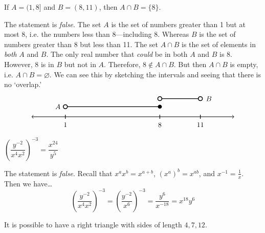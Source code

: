 \documentclass[11pt,letterpaper]{article}
\begin{document}
\thispagestyle{title}

 If $A= (1, 8]$ and $B= (8, 11)$, then $A \cap B= \{ 8 \}$. \pspace

\sol The statement is \textit{false}. The set $A$ is the set of numbers greater than 1 but at most 8, i.e. the numbers less than 8---including 8. Whereas $B$ is the set of numbers greater than 8 but less than 11. The set $A \cap B$ is the set of elements in \textit{both} $A$ and $B$. The only real number that \textit{could} be in both $A$ and $B$ is $8$. However, 8 is in $B$ but not in $A$. Therefore, $8 \notin A \cap B$. But then $A \cap B$ is empty, i.e. $A \cap B= \varnothing$. We can see this by sketching the intervals and seeing that there is no `overlap.' 
	\[
	\begin{tikzpicture}
	\draw[line width=0.03cm,<->] (-5,0) -- (5,0);		%
	
	\draw[line width=0.03cm] (-3.33,-0.1) -- (-3.33,0.1);	%
	\draw[line width=0.03cm] (1.33,-0.1) -- (1.33,0.1); 	%
	\draw[line width=0.03cm] (3.33,-0.1) -- (3.33,0.1);	%
	\draw[line width=0.03cm] (-3.33, 0.5) -- (1.33,0.5);			%
	\draw[fill=white,line width=0.04cm] (-3.33,0.5) circle (0.1);		%
	\draw[draw=none,fill=black] (1.33,0.5) circle (0.1);			%
	\node at (-3.7,0.5) {$A$};								%
	\draw[line width=0.03cm] (1.33, 0.9) -- (3.33,0.9);			%
	\draw[fill=white,line width=0.04cm] (1.33,0.9) circle (0.1);		%
	\draw[fill=white,line width=0.04cm] (3.33,0.9) circle (0.1);		%
	\node at (3.75,0.9) {$B$};								%
	\node at (-3.33,-0.4) {$1$};	%
	\node at (1.33,-0.4) {$8$};		%
	\node at (3.33,-0.4) {$11$};	%
	\end{tikzpicture}
	\] \pvspace{1.3cm}



 $\left( \dfrac{y^{-2}}{x^4 x^2} \right)^{-3}= \dfrac{x^{24}}{y^5}$ \pspace

\sol The statement is \textit{false}. Recall that $x^a x^b= x^{a + b}$, $(x^a)^b= x^{ab}$, and $x^{-1}= \frac{1}{x}$. Then we have\dots
	\[
	\left( \dfrac{y^{-2}}{x^4 x^2} \right)^{-3}= \left( \dfrac{y^{-2}}{x^6} \right)^{-3}= \dfrac{y^6}{x^{-18}}= x^{18} y^6
	\] \pvspace{1.3cm}



 It is possible to have a right triangle with sides of length $4, 7, 12$. \pspace
\end{document}
